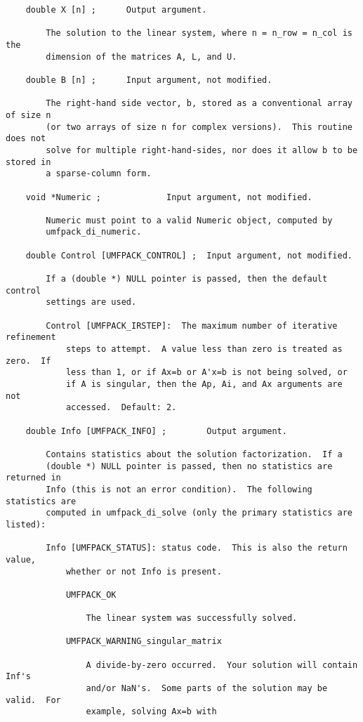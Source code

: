 \documentclass[11pt]{article}
\begin{document}
{\begin{verbatim}
    double X [n] ;      Output argument.

        The solution to the linear system, where n = n_row = n_col is the
        dimension of the matrices A, L, and U.

    double B [n] ;      Input argument, not modified.

        The right-hand side vector, b, stored as a conventional array of size n
        (or two arrays of size n for complex versions).  This routine does not
        solve for multiple right-hand-sides, nor does it allow b to be stored in
        a sparse-column form.

    void *Numeric ;             Input argument, not modified.

        Numeric must point to a valid Numeric object, computed by
        umfpack_di_numeric.

    double Control [UMFPACK_CONTROL] ;  Input argument, not modified.

        If a (double *) NULL pointer is passed, then the default control
        settings are used.

        Control [UMFPACK_IRSTEP]:  The maximum number of iterative refinement
            steps to attempt.  A value less than zero is treated as zero.  If
            less than 1, or if Ax=b or A'x=b is not being solved, or
            if A is singular, then the Ap, Ai, and Ax arguments are not
            accessed.  Default: 2.

    double Info [UMFPACK_INFO] ;        Output argument.

        Contains statistics about the solution factorization.  If a
        (double *) NULL pointer is passed, then no statistics are returned in
        Info (this is not an error condition).  The following statistics are
        computed in umfpack_di_solve (only the primary statistics are listed):

        Info [UMFPACK_STATUS]: status code.  This is also the return value,
            whether or not Info is present.

            UMFPACK_OK

                The linear system was successfully solved.

            UMFPACK_WARNING_singular_matrix

                A divide-by-zero occurred.  Your solution will contain Inf's
                and/or NaN's.  Some parts of the solution may be valid.  For
                example, solving Ax=b with


\end{verbatim}}
\end{document}
